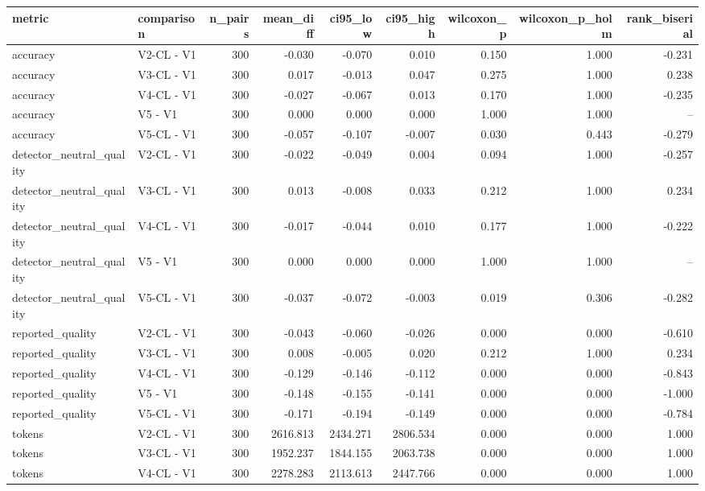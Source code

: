 \begin{table}[t]
\centering
\small
\begin{tabular}{llrrrrrrr}
\toprule
metric & comparison & n\_pairs & mean\_diff & ci95\_low & ci95\_high & wilcoxon\_p & wilcoxon\_p\_holm & rank\_biserial \\
\midrule
accuracy & V2-CL - V1 & 300 & -0.030 & -0.070 & 0.010 & 0.150 & 1.000 & -0.231 \\
accuracy & V3-CL - V1 & 300 & 0.017 & -0.013 & 0.047 & 0.275 & 1.000 & 0.238 \\
accuracy & V4-CL - V1 & 300 & -0.027 & -0.067 & 0.013 & 0.170 & 1.000 & -0.235 \\
accuracy & V5 - V1 & 300 & 0.000 & 0.000 & 0.000 & 1.000 & 1.000 & -- \\
accuracy & V5-CL - V1 & 300 & -0.057 & -0.107 & -0.007 & 0.030 & 0.443 & -0.279 \\
detector\_neutral\_quality & V2-CL - V1 & 300 & -0.022 & -0.049 & 0.004 & 0.094 & 1.000 & -0.257 \\
detector\_neutral\_quality & V3-CL - V1 & 300 & 0.013 & -0.008 & 0.033 & 0.212 & 1.000 & 0.234 \\
detector\_neutral\_quality & V4-CL - V1 & 300 & -0.017 & -0.044 & 0.010 & 0.177 & 1.000 & -0.222 \\
detector\_neutral\_quality & V5 - V1 & 300 & 0.000 & 0.000 & 0.000 & 1.000 & 1.000 & -- \\
detector\_neutral\_quality & V5-CL - V1 & 300 & -0.037 & -0.072 & -0.003 & 0.019 & 0.306 & -0.282 \\
reported\_quality & V2-CL - V1 & 300 & -0.043 & -0.060 & -0.026 & 0.000 & 0.000 & -0.610 \\
reported\_quality & V3-CL - V1 & 300 & 0.008 & -0.005 & 0.020 & 0.212 & 1.000 & 0.234 \\
reported\_quality & V4-CL - V1 & 300 & -0.129 & -0.146 & -0.112 & 0.000 & 0.000 & -0.843 \\
reported\_quality & V5 - V1 & 300 & -0.148 & -0.155 & -0.141 & 0.000 & 0.000 & -1.000 \\
reported\_quality & V5-CL - V1 & 300 & -0.171 & -0.194 & -0.149 & 0.000 & 0.000 & -0.784 \\
tokens & V2-CL - V1 & 300 & 2616.813 & 2434.271 & 2806.534 & 0.000 & 0.000 & 1.000 \\
tokens & V3-CL - V1 & 300 & 1952.237 & 1844.155 & 2063.738 & 0.000 & 0.000 & 1.000 \\
tokens & V4-CL - V1 & 300 & 2278.283 & 2113.613 & 2447.766 & 0.000 & 0.000 & 1.000 \\

\end{tabular}
\end{table}
